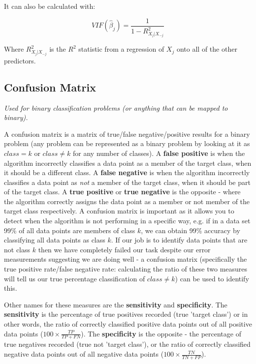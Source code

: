 It can also be calculated with:

$$ VIF(\hat{\beta}_{j}) = \frac{1}{1-R^{2}_{X_{j}|X_{-j}}} $$

Where $R^{2}_{X_{j}|X_{-j}}$ is the $R^{2}$ statistic from a regression of $X_{j}$ onto all of the other predictors.

\subsection{Confusion Matrix}

\textit{Used for binary classification problems (or anything that can be mapped to binary).}

A confusion matrix is a matrix of true/false negative/positive results for a binary problem (any problem can be represented as a binary problem by looking at it as $class=k$ or $class\neq k$ for any number of classes). A \textbf{false positive} is when the algorithm incorrectly classifies a data point as a member of the target class, when it should be a different class. A \textbf{false negative} is when the algorithm incorrectly classifies a data point as \textit{not} a member of the target class, when it should be part of the target class. A \textbf{true positive} or \textbf{true negative} is the opposite - where the algorithm correctly assigns the data point as a member or not member of the target class respectively. A confusion matrix is important as it allows you to detect when the algorithm is not performing in a specific way, e.g. if in a data set 99\% of all data points are members of class $k$, we can obtain 99\% accuracy by classifying all data points as class $k$. If our job is to identify data points that are not class $k$ then we have completely failed our task despite our error measurements suggesting we are doing well - a confusion matrix (specifically the true positive rate/false negative rate: calculating the ratio of these two measures will tell us our true percentage classification of $class\neq k$) can be used to identify this. 

Other names for these measures are the \textbf{sensitivity} and \textbf{specificity}. The \textbf{sensitivity} is the percentage of true positives recorded (true 'target class') or in other words, the ratio of correctly classified positive data points out of all positive data points ($100\times \frac{TP}{TP+FN}$). The \textbf{specificity} is the opposite - the percentage of true negatives recorded (true not 'target class'), or the ratio of correctly classified negative data points out of all negative data points ($100\times \frac{TN}{TN+FP}$).

